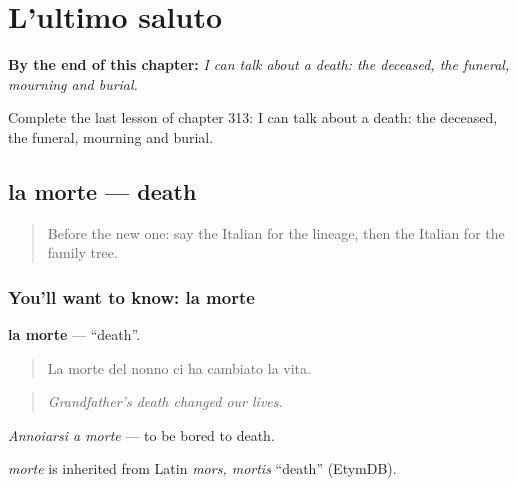 
\chapter{L'ultimo saluto}
\label{ch:it-l-ultimo-saluto}

\begin{chapteropening}
\textbf{By the end of this chapter:} \emph{I can talk about a death: the deceased, the funeral, mourning and burial.}

Complete the last lesson of chapter 313: I can talk about a death: the deceased, the funeral, mourning and burial.
\end{chapteropening}

\section[la morte]{la morte — death}

\label{lesson:IT-C313-morte}



\begin{quote}
Before the new one: say the Italian for the lineage, then the Italian for the family tree.
\end{quote}

\subsection*{You'll want to know: la morte}
\textbf{la morte} — \textquotedblleft{}death\textquotedblright{}.

\begin{quote}
La morte del nonno ci ha cambiato la vita.
\end{quote}

\begin{quote}
\emph{Grandfather's death changed our lives.}
\end{quote}

\emph{Annoiarsi a morte} — to be bored to death.

\begin{cousinweb}
\emph{morte} is inherited from Latin \emph{mors, mortis} \textquotedblleft{}death\textquotedblright{} (EtymDB).
\end{cousinweb}

